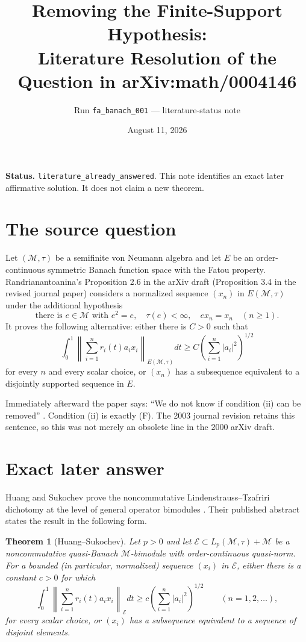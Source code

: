 \documentclass[11pt]{article}
\title{Removing the Finite-Support Hypothesis:\\
Literature Resolution of the Question in arXiv:math/0004146}
\author{Run \texttt{fa\_banach\_001} --- literature-status note}
\date{August 11, 2026}
\newtheorem*{theorem}{Theorem}
\newcommand{\M}{\mathcal M}
\newcommand{\Ecal}{\mathcal E}
\begin{document}
\maketitle

\noindent\textbf{Status.} \texttt{literature\_already\_answered}. This note
identifies an exact later affirmative solution. It does not claim a new theorem.

\section*{The source question}
Let $(\M,\tau)$ be a semifinite von Neumann algebra and let $E$ be an
order-continuous symmetric Banach function space with the Fatou property.
Randrianantoanina's Proposition 2.6 in the arXiv draft (Proposition 3.4 in the
revised journal paper) considers a normalized sequence $(x_n)$ in
$E(\M,\tau)$ under the additional hypothesis
\begin{equation*}
 \text{there is }e\in\M\text{ with }e^2=e,\quad \tau(e)<\infty,
 \quad ex_n=x_n\quad(n\geq1).                         \tag{F}
\end{equation*}
It proves the following alternative: either there is $C>0$ such that
\begin{equation*}
 \int_0^1\left\|\sum_{i=1}^n r_i(t)a_i x_i\right\|_{E(\M,\tau)}dt
 \geq C\left(\sum_{i=1}^n|a_i|^2\right)^{1/2}        \tag{R}
\end{equation*}
for every $n$ and every scalar choice, or $(x_n)$ has a subsequence
equivalent to a disjointly supported sequence in $E$.

Immediately afterward the paper says: ``We do not know if condition (ii) can
be removed'' \cite[Remarks 3.5]{R}.  Condition (ii) is exactly (F).  The 2003
journal revision retains this sentence, so this was not merely an obsolete
line in the 2000 arXiv draft.

\section*{Exact later answer}
Huang and Sukochev prove the noncommutative Lindenstrauss--Tzafriri
dichotomy at the level of general operator bimodules \cite{HS}.  Their
published abstract states the result in the following form.

\begin{theorem}[Huang--Sukochev]
Let $p>0$ and let $\Ecal\subset L_p(\M,\tau)+\M$ be a noncommutative
quasi-Banach $\M$-bimodule with order-continuous quasi-norm.  For a bounded
(in particular, normalized) sequence $(x_i)$ in $\Ecal$, either there is a
constant $c>0$ for which
\[
 \int_0^1\left\|\sum_{i=1}^n r_i(t)a_i x_i\right\|_{\Ecal}dt
 \geq c\left(\sum_{i=1}^n|a_i|^2\right)^{1/2}
 \qquad(n=1,2,\ldots),
\]
for every scalar choice, or $(x_i)$ has a subsequence equivalent to a
sequence of disjoint elements.
\end{theorem}
\end{document}
